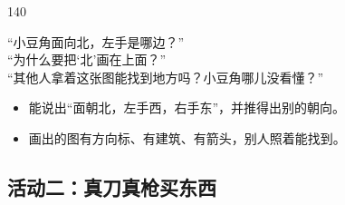 \begin{lesson}{1}{40}
\begin{saybox}
“小豆角面向北，左手是哪边？”\\
“为什么要把‘北’画在上面？”\\
“其他人拿着这张图能找到地方吗？小豆角哪儿没看懂？”
\end{saybox}

\begin{passbox}
\begin{itemize}
  \item 能说出“面朝北，左手西，右手东”，并推得出别的朝向。
  \item 画出的图有方向标、有建筑、有箭头，别人照着能找到。
\end{itemize}
\end{passbox}
\end{lesson}

\subsection{活动二：真刀真枪买东西}

